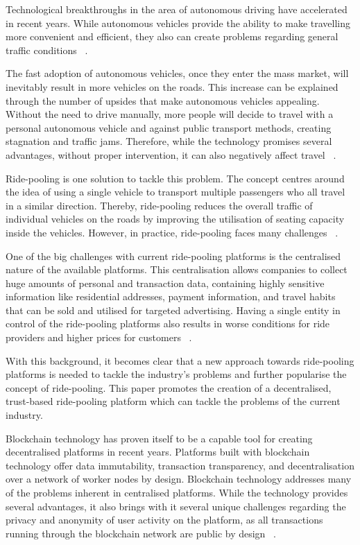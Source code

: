 Technological breakthroughs in the area of autonomous driving have accelerated in recent years.
While autonomous vehicles provide the ability to make travelling more convenient and efficient, they also can create problems regarding general traffic conditions ~\cite{Riel.2022}.

The fast adoption of autonomous vehicles, once they enter the mass market, will inevitably result in more vehicles on the roads. This increase can be explained through the number of upsides that make autonomous vehicles appealing. Without the need to drive manually, more people will decide to travel with a personal autonomous vehicle and against public transport methods, creating stagnation and traffic jams. Therefore, while the technology promises several advantages, without proper intervention, it can also negatively affect  travel ~\cite{Riel.2022}.

Ride-pooling is one solution to tackle this problem. The concept centres around the idea of using a single vehicle to transport multiple passengers who all travel in a similar direction. Thereby, ride-pooling reduces the overall traffic of individual vehicles on the roads by improving the utilisation of seating capacity inside the vehicles. However, in practice, ride-pooling faces many challenges ~\cite{Riel.2022}.

One of the big challenges with current ride-pooling platforms is the centralised nature of the available platforms. This centralisation allows companies to collect huge amounts of personal and transaction data, containing highly sensitive information like residential addresses, payment information, and travel habits that can be sold and utilised for targeted advertising. Having a single entity in control of the ride-pooling platforms also results in worse conditions for ride providers and higher prices for customers ~\cite{Badr.}. 

With this background, it becomes clear that a new approach towards ride-pooling platforms is needed to tackle the industry's problems and further popularise the concept of ride-pooling. This paper promotes the creation of a decentralised, trust-based ride-pooling platform which can tackle the problems of the current industry.

Blockchain technology has proven itself to be a capable tool for creating decentralised platforms in recent years. Platforms built with blockchain technology offer  data immutability, transaction transparency, and decentralisation  over a network of worker nodes by design. Blockchain technology addresses many of the problems inherent in centralised platforms. While the technology provides several advantages, it also brings with it several unique challenges regarding the privacy and anonymity of user activity on the platform, as all transactions running through the blockchain network are public by design ~\cite{Mahmoud.2022}.


